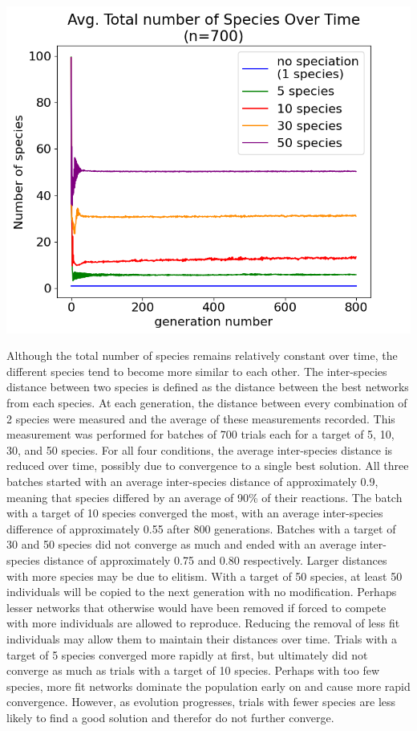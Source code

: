 \documentclass[12pt]{report}
\begin{document}
\begin{center}
    \includegraphics[width=18cm]{images/avg_num_species.png}
    \label{fig:avg_num_species}
\end{center}


Although the total number of species remains relatively constant over time, the different species tend to become more similar to each other. The inter-species distance between two species is defined as the distance between the best networks from each species. At each generation, the distance between every combination of 2 species were measured and the average of these measurements recorded. This measurement was performed for batches of 700 trials each for a target of 5, 10, 30, and 50 species. For all four conditions, the average inter-species distance is reduced over time, possibly due to convergence to a single best solution. All three batches started with an average inter-species distance of approximately 0.9, meaning that species differed by an average of 90\% of their reactions. The batch with a target of 10 species converged the most, with an average inter-species difference of approximately 0.55 after 800 generations.   Batches with a target of 30 and 50 species did not converge as much and ended with an average inter-species distance of approximately 0.75 and 0.80 respectively. Larger distances with more species may be due to elitism. With a target of 50 species, at least 50 individuals will be copied to the next generation with no modification. Perhaps lesser networks that otherwise would have been removed if forced to compete with more individuals are allowed to reproduce. Reducing the removal of less fit individuals may allow them to maintain their distances over time. Trials with a target of 5 species converged more rapidly at first, but ultimately did not converge as much as trials with a target of 10 species. Perhaps with too few species, more fit networks dominate the population early on and cause more rapid convergence. However, as evolution progresses, trials with fewer species are less likely to find a good solution and therefor do not further converge.
\end{document}
